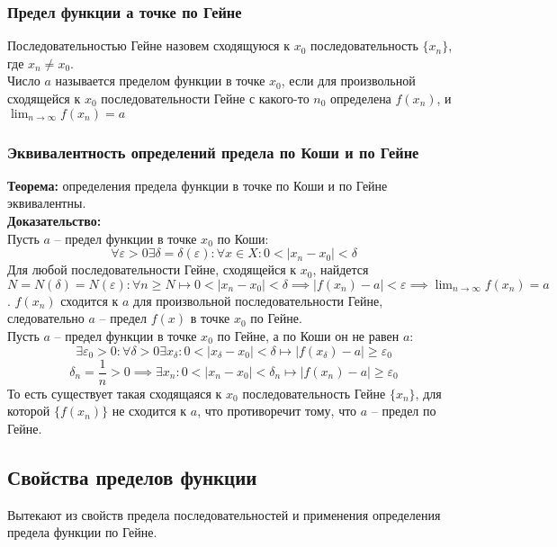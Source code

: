 \documentclass{article}
\begin{document}
    \subsubsection*{Предел функции а точке по Гейне}
        Последовательностью Гейне назовем сходящуюся к $x_0$ последовательность $\{x_n\}$, где $x_n \neq x_0$.
        \\
        Число $a$ называется пределом функции в точке $x_0$, если для произвольной сходящейся к $x_0$ последовательности Гейне с какого-то $n_0$ определена $f(x_n)$,
        и $\lim_{n \to \infty} f(x_n) = a$
    
    \subsubsection*{Эквивалентность определений предела по Коши и по Гейне}
        \textbf{Теорема:} определения предела функции в точке по Коши и по Гейне эквивалентны.
        \\
        \textbf{Доказательство:}
        \\
        Пусть $a$ -- предел функции в точке $x_0$ по Коши:
        \[ \forall \varepsilon > 0 \exists \delta = \delta(\varepsilon): \forall x \in X: 0 < |x_n - x_0| < \delta \]
        Для любой последовательности Гейне, сходящейся к $x_0$, найдется $N = N(\delta) = N(\varepsilon): 
        \forall n \ge N \longmapsto 0 < |x_n - x_0| < \delta \implies |f(x_n) - a| < \varepsilon \implies \lim_{n \to \infty} f(x_n) = a$. $f(x_n)$ сходится к $a$ для произвольной последовательности
        Гейне, следовательно $a$ -- предел $f(x)$ в точке $x_0$ по Гейне.
        \\
        Пусть $a$ -- предел функции в точке $x_0$ по Гейне, а по Коши он не равен $a$:
        \[ \exists \varepsilon_0 > 0: \forall \delta > 0 \exists x_\delta: 0 < |x_\delta - x_0| < \delta \longmapsto |f(x_\delta) - a| \ge \varepsilon_0 \]
        \[\delta_n = \frac{1}{n} > 0 \implies \exists x_n: 0 < |x_n - x_0| < \delta_n \longmapsto |f(x_n) - a| \ge \varepsilon_0 \]
        То есть существует такая сходящаяся к $x_0$ последовательность Гейне $\{x_n\}$, для которой $\{f(x_n)\}$ не сходится к $a$, что противоречит тому, что $a$ -- предел по Гейне.  
    
    \subsection*{Свойства пределов функции}
        Вытекают из свойств предела последовательностей и применения определения предела функции по Гейне.
    
\end{document}
